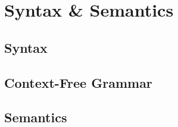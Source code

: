 \chapter{Syntax & Semantics}\label{ch:syntax-&-semantics}


\section{Syntax}\label{sec:syntax}



\section{Context-Free Grammar}\label{sec:grammar}



\section{Semantics}\label{sec:semantics}

